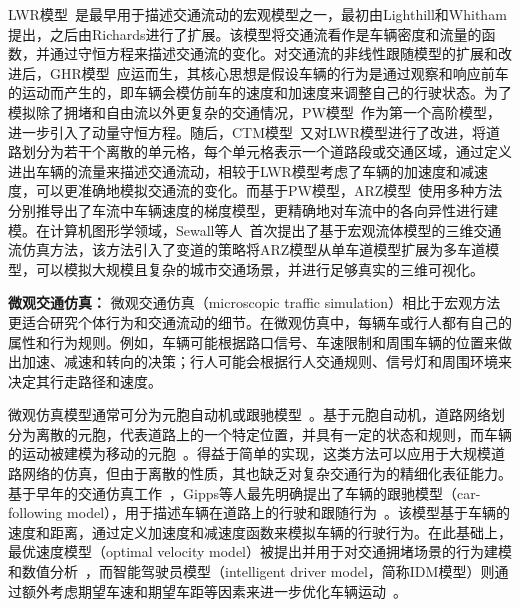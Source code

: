 LWR模型~\cite{lighthill1955kinematic}是最早用于描述交通流动的宏观模型之一，最初由Lighthill和Whitham提出，之后由Richards进行了扩展。该模型将交通流看作是车辆密度和流量的函数，并通过守恒方程来描述交通流的变化。对交通流的非线性跟随模型的扩展和改进后，GHR模型~\cite{gazis1961nonlinear}应运而生，其核心思想是假设车辆的行为是通过观察和响应前车的运动而产生的，即车辆会模仿前车的速度和加速度来调整自己的行驶状态。为了模拟除了拥堵和自由流以外更复杂的交通情况，PW模型~\cite{payne1971model, whitham1974linear}作为第一个高阶模型，进一步引入了动量守恒方程。随后，CTM模型~\cite{daganzo1994cell}又对LWR模型进行了改进，将道路划分为若干个离散的单元格，每个单元格表示一个道路段或交通区域，通过定义进出车辆的流量来描述交通流动，相较于LWR模型考虑了车辆的加速度和减速度，可以更准确地模拟交通流的变化。而基于PW模型，ARZ模型~\cite{aw2000resurrection, zhang2002non}使用多种方法分别推导出了车流中车辆速度的梯度模型，更精确地对车流中的各向异性进行建模。在计算机图形学领域，Sewall等人~\cite{sewall2010continuum}首次提出了基于宏观流体模型的三维交通流仿真方法，该方法引入了变道的策略将ARZ模型从单车道模型扩展为多车道模型，可以模拟大规模且复杂的城市交通场景，并进行足够真实的三维可视化。



\textbf{微观交通仿真：} 微观交通仿真（microscopic traffic simulation）相比于宏观方法更适合研究个体行为和交通流动的细节。在微观仿真中，每辆车或行人都有自己的属性和行为规则。例如，车辆可能根据路口信号、车速限制和周围车辆的位置来做出加速、减速和转向的决策；行人可能会根据行人交通规则、信号灯和周围环境来决定其行走路径和速度。

微观仿真模型通常可分为元胞自动机或跟驰模型~\cite{saifuzzaman2014incorporating, wang2017survey, chao2020survey}。基于元胞自动机，道路网络划分为离散的元胞，代表道路上的一个特定位置，并具有一定的状态和规则，而车辆的运动被建模为移动的元胞~\cite{nagel1992cellular, knospe2004empirical}。得益于简单的实现，这类方法可以应用于大规模道路网络的仿真，但由于离散的性质，其也缺乏对复杂交通行为的精细化表征能力。基于早年的交通仿真工作~\cite{pipes1953operational, herman1963vehicular}，Gipps等人最先明确提出了车辆的跟驰模型（car-following model），用于描述车辆在道路上的行驶和跟随行为~\cite{gipps1981behavioural}。该模型基于车辆的速度和距离，通过定义加速度和减速度函数来模拟车辆的行驶行为。在此基础上，最优速度模型（optimal velocity model）被提出并用于对交通拥堵场景的行为建模和数值分析~\cite{bando1995dynamical}，而智能驾驶员模型（intelligent driver model，简称IDM模型）则通过额外考虑期望车速和期望车距等因素来进一步优化车辆运动~\cite{treiber2000congested-idm}。

